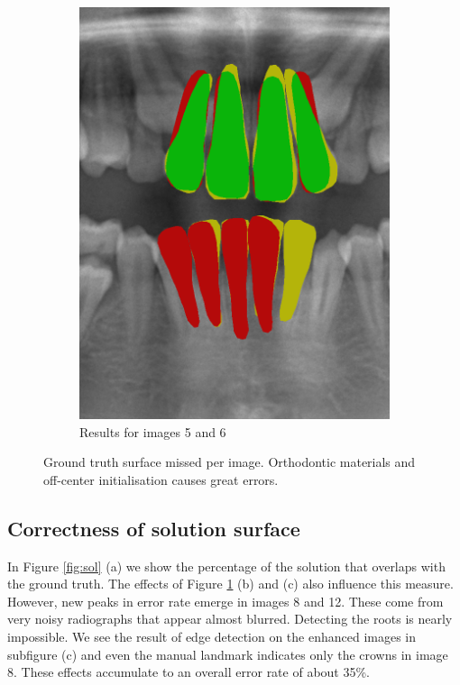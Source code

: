 \documentclass[a4paper,titlepage,12pt]{article}
\begin{document}
\begin{figure}
\begin{subfigure}{0.48\linewidth}
		\includegraphics[width=0.48\columnwidth]{results/6i10}
		\caption{Results for images 5 and 6}
	\end{subfigure}
	\caption{Ground truth surface missed per image. Orthodontic materials and off-center initialisation causes great errors. }
	\label{fig:miss}
\end{figure}

\subsection{Correctness of solution surface}
In Figure \ref{fig:sol} (a) we show the percentage of the solution that overlaps with the ground truth. The effects of Figure \ref{fig:miss} (b) and (c) also influence this measure. However, new peaks in error rate emerge in images 8 and 12. These come from very noisy radiographs that appear almost blurred. Detecting the roots is nearly impossible. We see the result of edge detection on the enhanced images in subfigure (c) and even the manual landmark indicates only the crowns in image 8. These effects accumulate to an overall error rate of about 35\%. 
\end{document}
